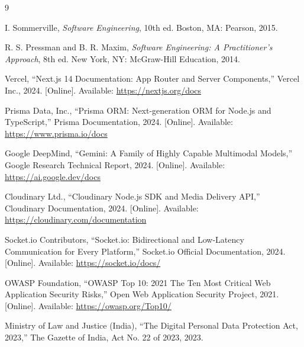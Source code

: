 \documentclass[11pt,a4paper]{report}
\begin{document}
\begin{thebibliography}{9}

I. Sommerville, \emph{Software Engineering}, 10th ed. Boston, MA: Pearson, 2015.

R. S. Pressman and B. R. Maxim, \emph{Software Engineering: A Practitioner's Approach}, 8th ed. New York, NY: McGraw-Hill Education, 2014.

Vercel, ``Next.js 14 Documentation: App Router and Server Components,'' Vercel Inc., 2024. [Online]. Available: \url{https://nextjs.org/docs}

Prisma Data, Inc., ``Prisma ORM: Next-generation ORM for Node.js and TypeScript,'' Prisma Documentation, 2024. [Online]. Available: \url{https://www.prisma.io/docs}

Google DeepMind, ``Gemini: A Family of Highly Capable Multimodal Models,'' Google Research Technical Report, 2024. [Online]. Available: \url{https://ai.google.dev/docs}

Cloudinary Ltd., ``Cloudinary Node.js SDK and Media Delivery API,'' Cloudinary Documentation, 2024. [Online]. Available: \url{https://cloudinary.com/documentation}

Socket.io Contributors, ``Socket.io: Bidirectional and Low-Latency Communication for Every Platform,'' Socket.io Official Documentation, 2024. [Online]. Available: \url{https://socket.io/docs/}

OWASP Foundation, ``OWASP Top 10: 2021 The Ten Most Critical Web Application Security Risks,'' Open Web Application Security Project, 2021. [Online]. Available: \url{https://owasp.org/Top10/}

Ministry of Law and Justice (India), ``The Digital Personal Data Protection Act, 2023,'' The Gazette of India, Act No. 22 of 2023, 2023.

\end{thebibliography}
\end{document}
